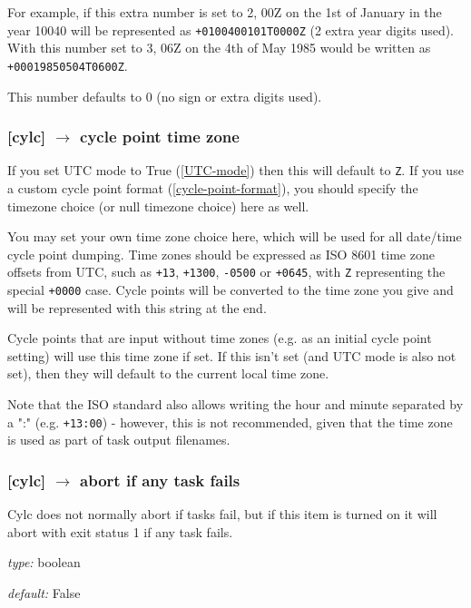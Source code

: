 For example, if this extra number is set to 2, 00Z on the 1st of January in
the year 10040 will be represented as \lstinline=+0100400101T0000Z= (2 extra
year digits used). With this number set to 3, 06Z on the 4th of May 1985 would
be written as \lstinline=+00019850504T0600Z=.

This number defaults to 0 (no sign or extra digits used).

\subsubsection[cycle point time zone]{ [cylc] $\rightarrow$
cycle point time zone}
\label{cycle-point-time-zone}

If you set UTC mode to True (\ref{UTC-mode}) then this will default to
\lstinline=Z=. If you use a custom cycle point format
(\ref{cycle-point-format}), you should specify the timezone choice (or null
timezone choice) here as well.

You may set your own time zone choice here, which will be used for all
date/time cycle point dumping. Time zones should be expressed as ISO 8601 time
zone offsets from UTC, such as \lstinline=+13=, \lstinline=+1300=,
\lstinline=-0500= or \lstinline=+0645=, with \lstinline=Z= representing the
special \lstinline=+0000= case. Cycle points will be converted to the time
zone you give and will be represented with this string at the end.

Cycle points that are input without time zones (e.g. as an initial cycle point
setting) will use this time zone if set. If this isn't set (and UTC mode is
also not set), then they will default to the current local time zone.

Note that the ISO standard also allows writing the hour and minute separated
by a ":" (e.g. \lstinline=+13:00=) - however, this is not recommended, given
that the time zone is used as part of task output filenames.

\subsubsection[abort if any task fails]{[cylc] $\rightarrow$ abort if any task fails}

Cylc does not normally abort if tasks fail, but if this item is turned
on it will abort with exit status 1 if any task fails.

\begin{myitemize}
    \item {\em type:} boolean
    \item {\em default:} False
\end{myitemize}

